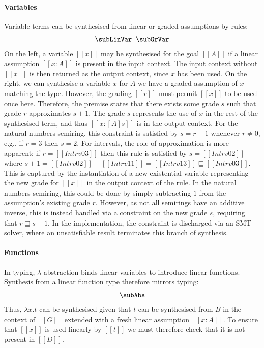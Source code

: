   \paragraph{Variables}
Variable terms can be synthesised from linear or graded assumptions by rules:
%
  \begin{align*}
  \subLinVar
  \;\;
  \subGrVar
  \end{align*}
%
On the left, a variable $[[x]]$ may be synthesised for the goal
$[[ A ]]$ if a linear assumption $[[ x : A ]]$ is present
  in the input context. The input context without $[[x]]$ is then returned as
  the output context, since $x$ has been used. On the right,
  we can synthesise a variable $x$ for $A$ we have a graded
  assumption of $x$ matching the type. However, %
  the grading $[[ r ]]$ must permit $[[ x ]]$ to
  be used once here. Therefore, the premise states that there exists
  some grade $s$ such that grade $r$ approximates $s + 1$. The grade $s$
  represents the use of $x$ in the rest of the synthesised term, and
  thus $[[ x : [ A ] s ]]$ is in the output context. For the natural
  numbers semiring, this constraint is satisfied by $s = r - 1$ whenever $r \neq
  0$, e.g., if $r = 3$ then $s = 2$. For
  intervals, the role of approximation is more apparent: if $r = [[
  Intrv 0 3]]$ then this rule is satisfied by $s = [[ Intrv 0 2 ]]$
  where $s + 1 = [[ Intrv 0 2 ]] + [[ Intrv 1 1 ]] = [[ Intrv 1 3 ]]
  \sqsubseteq [[ Intrv 0 3 ]]$.
  This is captured by the instantiation of a new
  existential variable representing the new grade for $[[x]]$ in the output
  context of the rule. In the natural numbers semiring, this could be done by
  simply subtracting $1$ from the assumption's
  existing grade $r$. However, as not all semirings have an
  additive inverse, this is instead handled via a constraint on the new grade
  $s$, requiring that $ r \sqsupseteq s + 1 $. In the implementation, the constraint is
  discharged via an SMT solver, where an unsatisfiable result terminates
  this branch of synthesis.

  \paragraph{Functions}
In typing, $\lambda$-abstraction binds linear variables to introduce
  linear functions. Synthesis from a linear function type therefore mirrors typing:
%
  \begin{align*}
\subAbs
    \end{align*}
%
  Thus, $\lambda x . t$ can be synthesised given that
  $t$ can be synthesised from $B$ in the context of $[[G]]$ extended with a fresh linear assumption $[[ x
  : A]]$. To ensure that $[[x]]$ is used linearly
  by $[[t]]$ we must therefore check that it is not present in
  $[[D]]$.

